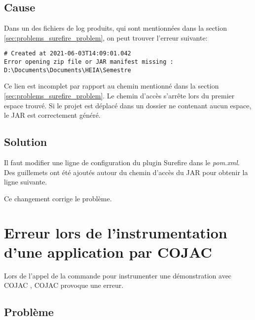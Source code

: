 \begin{minipage}{\linewidth}
\label{fig:problems_maven_skip_tests}
\end{minipage}

\subsection{Cause}

Dans un des fichiers de log produits, qui sont mentionnées dans la section \ref{sec:problems_surefire_problem}, on peut trouver l'erreur suivante:

\begin{verbatim}
# Created at 2021-06-03T14:09:01.042
Error opening zip file or JAR manifest missing : D:\Documents\Documents\HEIA\Semestre
\end{verbatim}

Ce lien est incomplet par rapport au chemin mentionné dans la section \ref{sec:problems_surefire_problem}. Le chemin d'accès s'arrête lors du premier espace trouvé. Si le projet est déplacé dans un dossier ne contenant aucun espace, le JAR est correctement généré.

\subsection{Solution}

Il faut modifier une ligne de configuration du plugin Surefire dans le \textit{pom.xml}. Des guillemets ont été ajoutés autour du chemin d'accès du JAR pour obtenir la ligne suivante.

Ce changement corrige le problème.

\section{Erreur lors de l'instrumentation d'une application par COJAC}
\label{sec:problem_cojac_instrumentation}

Lors de l'appel de la commande pour instrumenter une démonstration avec COJAC \cite{COJAC}, COJAC \cite{COJAC} provoque une erreur.

\subsection{Problème}

